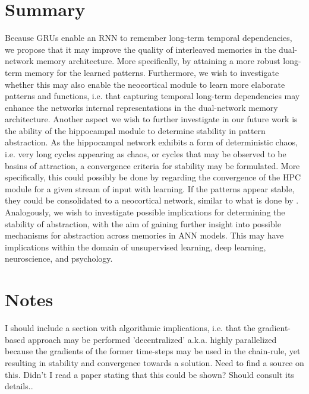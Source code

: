 \section{Summary}

Because GRUs enable an RNN to remember long-term temporal dependencies, we propose that it may improve the quality of interleaved memories in the dual-network memory architecture. More specifically, by attaining a more robust long-term memory for the learned patterns. Furthermore, we wish to investigate whether this may also enable the neocortical module to learn more elaborate patterns and functions, i.e. that capturing temporal long-term dependencies may enhance the networks internal representations in the dual-network memory architecture.
Another aspect we wish to further investigate in our future work is the ability of the hippocampal module to determine stability in pattern abstraction. As the hippocampal network exhibits a form of deterministic chaos, i.e. very long cycles appearing as chaos, or cycles that may be observed to be basins of attraction, a convergence criteria for stability may be formulated. More specifically, this could possibly be done by regarding the convergence of the HPC module for a given stream of input with learning. If the patterns appear stable, they could be consolidated to a neocortical network, similar to what is done by \cite{Hattori2014}. Analogously, we wish to investigate possible implications for determining the stability of abstraction, with the aim of gaining further insight into possible mechanisms for abstraction across memories in ANN models. This may have implications within the domain of unsupervised learning, deep learning, neuroscience, and psychology.

\section{Notes}

I should include a section with algorithmic implications, i.e. that the gradient-based approach may be performed 'decentralized' a.k.a. highly parallelized because the gradients of the former time-steps may be used in the chain-rule, yet resulting in stability and convergence towards a solution. Need to find a source on this. Didn't I read a paper stating that this could be shown? Should consult its details..


\cleardoublepage